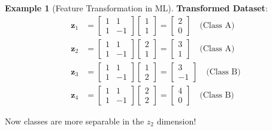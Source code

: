 \documentclass[12pt,a4paper]{article}
\theoremstyle{definition}
\newtheorem{example}{Example}[section]
\begin{document}
\begin{example}[Feature Transformation in ML]
\textbf{Transformed Dataset}:
\begin{align*}
\mathbf{z}_1 &= \begin{bmatrix} 1 & 1 \\ 1 & -1 \end{bmatrix} \begin{bmatrix} 1 \\ 1 \end{bmatrix} = \begin{bmatrix} 2 \\ 0 \end{bmatrix} \quad \text{(Class A)} \\
\mathbf{z}_2 &= \begin{bmatrix} 1 & 1 \\ 1 & -1 \end{bmatrix} \begin{bmatrix} 2 \\ 1 \end{bmatrix} = \begin{bmatrix} 3 \\ 1 \end{bmatrix} \quad \text{(Class A)} \\
\mathbf{z}_3 &= \begin{bmatrix} 1 & 1 \\ 1 & -1 \end{bmatrix} \begin{bmatrix} 1 \\ 2 \end{bmatrix} = \begin{bmatrix} 3 \\ -1 \end{bmatrix} \quad \text{(Class B)} \\
\mathbf{z}_4 &= \begin{bmatrix} 1 & 1 \\ 1 & -1 \end{bmatrix} \begin{bmatrix} 2 \\ 2 \end{bmatrix} = \begin{bmatrix} 4 \\ 0 \end{bmatrix} \quad \text{(Class B)}
\end{align*}

Now classes are more separable in the $z_2$ dimension!
\end{example}
\end{document}
